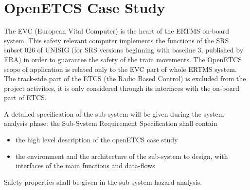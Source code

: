 \section{OpenETCS Case Study}
\label{sec:casestudy}



The EVC (European Vital Computer) is the heart of the ERTMS on-board system. This safety relevant
computer implements the functions of the SRS subset 026 of UNISIG (for SRS versions beginning
with baseline 3, published by ERA) in order to guarantee the safety of the train movements.
The OpenETCS scope of application is related only to the EVC part of whole ERTMS system.
The track-side part of the ETCS (the Radio Based Control) is excluded from the project activities, it is
only considered through its interfaces with the on-board part of ETCS.

A detailed specification of the sub-system will be given during the system analysis phase: the Sub-System Requirement Specification shall contain 
\begin{itemize}
\item the high level description of the openETCS case study
\item the environment and the architecture of the sub-system  to design, with
  interfaces of the main functions and data-flows
\end{itemize}

Safety properties shall be given in the sub-system hazard analysis.

